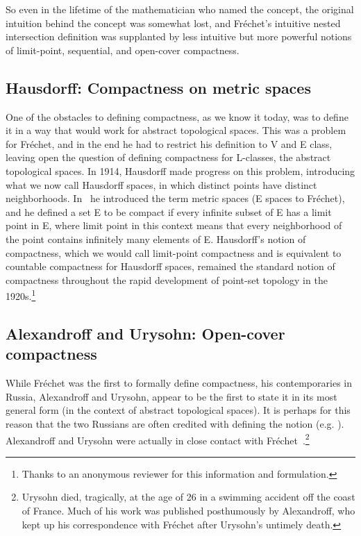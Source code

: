 \documentclass[12pt]{article}
\begin{document}
So even in the lifetime of the mathematician who named the concept, the original
intuition behind the concept was somewhat lost, and Fr\'{e}chet's intuitive nested
intersection definition was supplanted by less intuitive but more powerful notions of
limit-point, sequential, and open-cover compactness.

\subsection{Hausdorff: Compactness on metric spaces}
One of the obstacles to defining compactness, as we know it today, was to define it
in a way that would work for abstract topological spaces. This was a problem
for Fr\'{e}chet, and in the end he had to restrict his definition to V and E class, leaving open the question of defining compactness for L-classes, the abstract topological spaces. In 1914, Hausdorff made progress on this problem, introducing what we now call Hausdorff spaces, in which distinct points have distinct neighborhoods. In~\cite{haus} he introduced the term metric spaces (E spaces to Fr\'{e}chet), and he defined a set E to be compact if every infinite subset of E has a limit point in E, where limit point in this context means that every neighborhood of the point contains infinitely many
elements of E. Hausdorff's notion of compactness, which we would call limit-point compactness 
and is equivalent to countable compactness for Hausdorff spaces, remained the standard notion of compactness throughout the rapid development of point-set topology in the 1920s.\footnote{Thanks to an anonymous reviewer for this information and formulation.}


\subsection{Alexandroff and Urysohn: Open-cover compactness}

While Fr\'{e}chet was the first to formally define compactness, his contemporaries in
Russia, Alexandroff and Urysohn, appear to be the first to state it in its most general
form (in the context of abstract topological spaces). It is perhaps for this reason that the 
two Russians are often credited with defining the notion (e.g. \cite[p. 425S]{math}). Alexandroff and Urysohn were actually in close contact with Fr\'{e}chet~\cite[pp. 319-357]{tay2}.\footnote{Urysohn died, tragically, at the age of 26 in a swimming accident off the coast of France. Much of his work was published posthumously by Alexandroff, who kept up his correspondence with Fr\'{e}chet after Urysohn's untimely death.}
\end{document}
